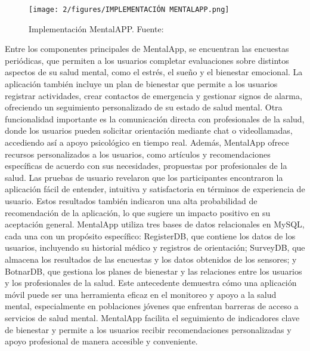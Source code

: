 \begin{figure}[ht]
	\centering
	\texttt{[image: 2/figures/IMPLEMENTACIÓN MENTALAPP.png]}
	\caption{Implementación MentalAPP. Fuente: \cite{coral2023}}
	\label{13:fig}
\end{figure}

Entre los componentes principales de MentalApp, se encuentran las encuestas periódicas, que permiten a los usuarios completar evaluaciones sobre distintos aspectos de su salud mental, como el estrés, el sueño y el bienestar emocional. La aplicación también incluye un plan de bienestar que permite a los usuarios registrar actividades, crear contactos de emergencia y gestionar signos de alarma, ofreciendo un seguimiento personalizado de su estado de salud mental. Otra funcionalidad importante es la comunicación directa con profesionales de la salud, donde los usuarios pueden solicitar orientación mediante chat o videollamadas, accediendo así a apoyo psicológico en tiempo real. Además, MentalApp ofrece recursos personalizados a los usuarios, como artículos y recomendaciones específicas de acuerdo con sus necesidades, propuestas por profesionales de la salud.
Las pruebas de usuario revelaron que los participantes encontraron la aplicación fácil de entender, intuitiva y satisfactoria en términos de experiencia de usuario. Estos resultados también indicaron una alta probabilidad de recomendación de la aplicación, lo que sugiere un impacto positivo en su aceptación general. MentalApp utiliza tres bases de datos relacionales en MySQL, cada una con un propósito específico: RegisterDB, que contiene los datos de los usuarios, incluyendo su historial médico y registros de orientación; SurveyDB, que almacena los resultados de las encuestas y los datos obtenidos de los sensores; y BotnarDB, que gestiona los planes de bienestar y las relaciones entre los usuarios y los profesionales de la salud. Este antecedente demuestra cómo una aplicación móvil puede ser una herramienta eficaz en el monitoreo y apoyo a la salud mental, especialmente en poblaciones jóvenes que enfrentan barreras de acceso a servicios de salud mental. MentalApp facilita el seguimiento de indicadores clave de bienestar y permite a los usuarios recibir recomendaciones personalizadas y apoyo profesional de manera accesible y conveniente.

